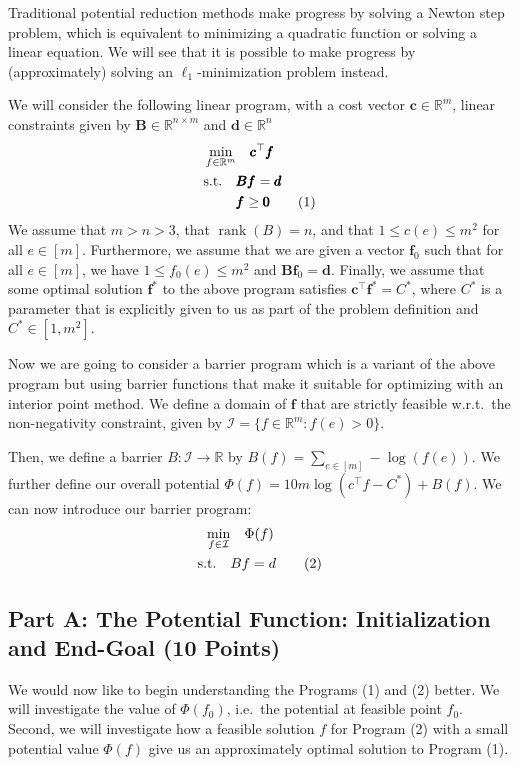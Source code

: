 \documentclass[a4paper,11pt]{article}
\begin{document}
Traditional potential reduction methods make progress by solving a Newton step problem, which is equivalent to minimizing a quadratic function or solving a linear equation. We will see that it is possible to make progress by (approximately) solving an \(\ell_1\)-minimization problem instead.

We will consider the following linear program, with a cost vector \(\pmb{c}\in \mathbb{R}^{m}\), linear constraints given by \(\pmb{B}\in \mathbb{R}^{n\times m}\) and \(\pmb{d}\in \mathbb{R}^{n}\)
\begin{align}
    \min_{f\in \mathbb{R}^{m}} &\quad \pmb{c}^{\top}\pmb{f} \notag\\
    \mathrm{s.t.}\quad &\pmb{B}\pmb{f} = \pmb{d} \notag\\
    &\pmb{f}\geq \pmb{0} \tag{1}
\end{align}
We assume that \(m > n > 3\), that \(\operatorname{rank}(B) = n\), and that \(1\leq c(e)\leq m^{2}\) for all \(e\in [m]\). Furthermore, we assume that we are given a vector \(\pmb{f}_{0}\) such that for all \(e\in [m]\), we have \(1\leq f_{0}(e)\leq m^{2}\) and \(\pmb{B}\pmb{f}_{0} = \pmb{d}\). Finally, we assume that some optimal solution \(\pmb{f}^{*}\) to the above program satisfies \(\pmb{c}^{\top}\pmb{f}^{*} = C^{*}\), where \(C^{*}\) is a parameter that is explicitly given to us as part of the problem definition and \(C^{*}\in [1,m^{2}]\).

Now we are going to consider a barrier program which is a variant of the above program but using barrier functions that make it suitable for optimizing with an interior point method. We define a domain of \(\pmb{f}\) that are strictly feasible w.r.t.\ the non-negativity constraint, given by \(\mathcal{I} = \{f\in \mathbb{R}^{m}: f(e) > 0\}\).

Then, we define a barrier \(B:\mathcal{I}\to \mathbb{R}\) by \(B(f) = \sum_{e\in [m]} -\log(f(e))\). We further define our overall potential \(\Phi(f) = 10m\log(c^{\top}f - C^{*}) + B(f)\). We can now introduce our barrier program:
\begin{align}
    \min_{f\in \mathcal{I}} &\quad \Phi(f) \notag\\
    \mathrm{s.t.}\quad & Bf = d \tag{2}
\end{align}

\subsection*{Part A: The Potential Function: Initialization and End-Goal (10 Points)}
We would now like to begin understanding the Programs (1) and (2) better. We will investigate the value of \(\Phi(f_{0})\), i.e.\ the potential at feasible point \(f_{0}\). Second, we will investigate how a feasible solution \(f\) for Program (2) with a small potential value \(\Phi(f)\) give us an approximately optimal solution to Program (1).
\end{document}
